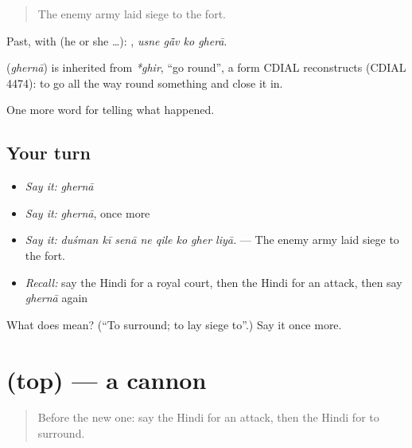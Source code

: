 \begin{quote}
The enemy army laid siege to the fort.
\end{quote}

Past, with  (he or she …):    , \emph{usne gā̃v ko gherā}.

\begin{cousinweb}
\textbf{} (\emph{ghernā}) is inherited from \emph{*ghir}, \textquotedblleft{}go round\textquotedblright{}, a form CDIAL reconstructs (CDIAL 4474): to go all the way round something and close it in.
\end{cousinweb}

\begin{grammarlens}[title={What you've built}]
One more word for telling what happened.
\end{grammarlens}

\subsection*{Your turn}
\begin{itemize}
\raggedright
  \item \emph{Say it:} \emph{ghernā}
  \item \emph{Say it:} \emph{ghernā}, once more
  \item \emph{Say it:} \emph{duśman kī senā ne qile ko gher liyā.} — The enemy army laid siege to the fort.
  \item \emph{Recall:} say the Hindi for a royal court, then the Hindi for an attack, then say \emph{ghernā} again
\end{itemize}

\begin{tcolorbox}[breakable,colback=teal!4,colframe=teal!35!black,title={Before you move on}]
What does  mean? (\textquotedblleft{}To surround; to lay siege to\textquotedblright{}.) Say it once more.
\end{tcolorbox}
\section[\texorpdfstring{\hi{तोप} (top)}{तोप (top)}]{ (top) — a cannon}

\label{lesson:HI-C321-top}



\begin{quote}
Before the new one: say the Hindi for an attack, then the Hindi for to surround.
\end{quote}

